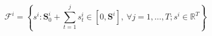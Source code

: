 \documentclass[runningheads]{llncs}
\newcommand{\li}[1][]{x^i_{#1}}
\newcommand{\oi}[1][]{n^i_{#1}}
\newcommand{\bsi}[1][]{b^i_{#1}}
\newcommand{\bai}[1][]{s^i_{#1}}
\newcommand{\fsi}{\mathcal{F}^i}
\newcommand{\storagei}{\mathbf{S}^i}
\newcommand{\bini}{\mathbf{S}^i_0}
\newcommand{\N}{\mathcal{N}}
\newcommand{\T}{\mathcal{T}}
\begin{document}



\begin{equation}
    \label{eq:feasible}
\fsi = \left\{ \bai \colon \bini + \sum^{j}_{t=1} \bai[t] \in [0, \storagei], \ \forall j=1, \dots, T;  \bai \in \mathbb{R}^T  \right\}
\end{equation}

\end{document}
